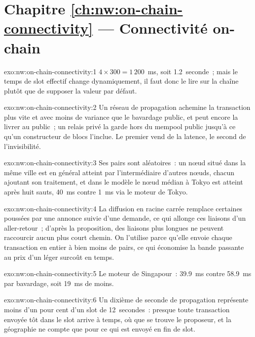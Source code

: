 \section*{Chapitre \ref{ch:nw:on-chain-connectivity} --- Connectivité on-chain}

\begin{solution}{exo:nw:on-chain-connectivity:1}
$4 \times 300 = 1\,200$~ms, soit 1.2~seconde~; mais le temps de slot effectif change dynamiquement, il faut donc le lire sur la chaîne plutôt que de supposer la valeur par défaut.
\end{solution}

\begin{solution}{exo:nw:on-chain-connectivity:2}
Un réseau de propagation achemine la transaction plus vite et avec moins de variance que le bavardage public, et peut encore la livrer au public~; un relais privé
la garde hors du mempool public jusqu'à ce qu'un constructeur de blocs l'inclue. Le premier vend de la latence, le second de l'invisibilité.
\end{solution}

\begin{solution}{exo:nw:on-chain-connectivity:3}
Ses pairs sont aléatoires~: un nœud situé dans la même ville est en général atteint par l'intermédiaire d'autres nœuds, chacun ajoutant son traitement, et dans le modèle le nœud médian à Tokyo est
atteint après huit sauts, \qty{40}{\milli\second} contre \qty{1}{\milli\second} via le moteur de Tokyo.
\end{solution}

\begin{solution}{exo:nw:on-chain-connectivity:4}
La diffusion en racine carrée remplace certaines poussées par une annonce suivie d'une demande, ce qui allonge ces liaisons d'un aller-retour~; d'après la proposition, des liaisons plus longues
ne peuvent raccourcir aucun plus court chemin. On l'utilise parce qu'elle envoie chaque transaction en entier à bien moins de pairs, ce qui économise la bande passante au prix d'un léger surcoût en temps.
\end{solution}

\begin{solution}{exo:nw:on-chain-connectivity:5}
Le moteur de Singapour~: \qty{39.9}{\milli\second} contre \qty{58.9}{\milli\second} par bavardage, soit \qty{19}{\milli\second} de moins.
\end{solution}

\begin{solution}{exo:nw:on-chain-connectivity:6}
Un dixième de seconde de propagation représente moins d'un pour cent d'un slot de 12~secondes~: presque toute transaction envoyée tôt dans le slot arrive à temps, où que se trouve
le proposeur, et la géographie ne compte que pour ce qui est envoyé en fin de slot.
\end{solution}

